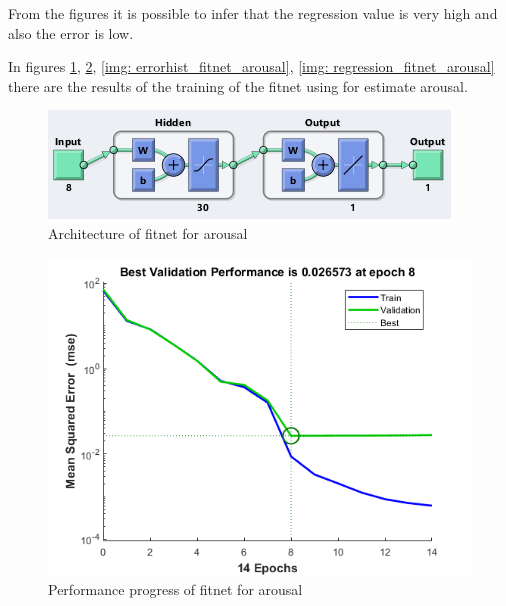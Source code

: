 \documentclass[a4paper]{report}
\begin{document}
	\noindent From the figures it is possible to infer that the regression value is very high and also the error is low.
	
	\noindent In figures \ref{img: fitnet_arousal}, \ref{img: perf_fitnet_arousal}, \ref{img: errorhist_fitnet_arousal}, \ref{img: regression_fitnet_arousal} there are the results of the training of the fitnet using for estimate arousal.
	\vspace{1cm}
		\begin{figure}[htbp]
		\centering
		\includegraphics[scale=1]{img/fitnet_arousal.png}
		\caption{Architecture of fitnet for arousal}
		\label{img: fitnet_arousal}
	\end{figure}
	
		\vspace{3cm}
		
	\begin{figure}[htbp]
		\centering
		\includegraphics[scale=1]{img/perf_fitnet_arousal.png}
		\caption{Performance progress of fitnet for arousal}
		\label{img: perf_fitnet_arousal}
	\end{figure}
	
\end{document}
